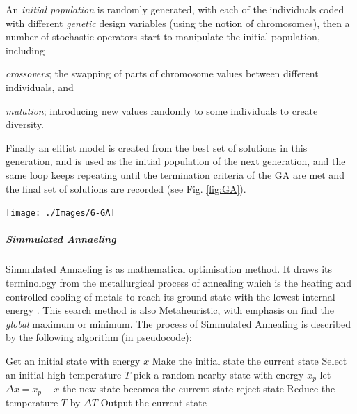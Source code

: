 \documentclass[11pt,a4paper,oneside]{article}
\newenvironment{Figure}		%
	{\par\medskip\noindent\minipage{\linewidth}}
	{\endminipage\par\medskip}
\begin{document}
\begin{multicols}{2}
	An \emph{initial population} is randomly generated, with each of the individuals coded with different \emph{genetic} design variables (using the notion of chromosomes), then a number of stochastic operators start to manipulate the initial population, including \begin{inparaenum} \item \emph{crossovers}; the swapping of parts of chromosome values between different individuals, and \item \emph{mutation}; introducing new values randomly to some individuals to create diversity.\end{inparaenum}

	Finally an elitist model is created from the best set of solutions in this generation, and is used as the initial population of the next generation, and the same loop keeps repeating until the termination criteria of the GA are met and the final set of solutions are recorded (see Fig. \ref{fig:GA}).

	\begin{Figure}
		\centering
		\texttt{[image: ./Images/6-GA]}
		\label{fig:GA}
	\end{Figure}

	\subparagraph{Simmulated Annaeling}

	Simmulated Annaeling is as mathematical optimisation method. It draws its terminology from the metallurgical process of annealing which is the heating and controlled cooling of metals to reach its ground state with the lowest internal energy \cite{lam88}. This search method is also Metaheuristic, with emphasis on find the \emph{global} maximum or minimum. The process of Simmulated Annealing is described by the following algorithm (in pseudocode):\\
	
		\begin{algorithmic}[1]
			\State Get an initial state with energy $x$
			\State Make the initial state the current state
			\State Select an initial high temperature $T$
				\State pick a random nearby state with energy $x_p$
				\State let $\Delta x = x_p - x$
					\State the new state becomes the current state
				\Else
					\State reject state
				\EndIf
			\EndWhile
			\State Reduce the temperature $T$ by $\Delta T$
			\EndWhile
			\State Output the current state
		\end{algorithmic}


\end{multicols}
\end{document}
